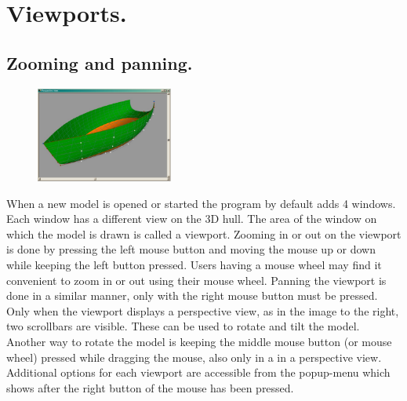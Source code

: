 \documentclass[12pt]{article}
\begin{document}
\pagebreak

\section{Viewports.}

\subsection{Zooming and panning.}

\begin{figure}
        \centering
        \includegraphics[width=0.4\textwidth,natwidth=1024,natheight=715]{figure8.png}
        \caption{}
        \label{fig:viewport}
\end{figure}

When a new model is opened or started the program by default adds 4
windows. Each window has a different view on the 3D hull. The area of
the window on which the model is drawn is called a viewport. Zooming
in or out on the viewport is done by pressing the left mouse button
and moving the mouse up or down while keeping the left button pressed.
Users having a mouse wheel may find it convenient to zoom in or out
using their mouse wheel. Panning the viewport is done in a similar
manner, only with the right mouse button must be pressed. Only when
the viewport displays a perspective view, as in the image to the
right, two scrollbars are visible. These can be used to rotate and
tilt the model. Another way to rotate the model is keeping the middle
mouse button (or mouse wheel) pressed while dragging the mouse, also
only in a in a perspective view. Additional options for each viewport
are accessible from the popup-menu which shows after the right button
of the mouse has been pressed.
\end{document}
